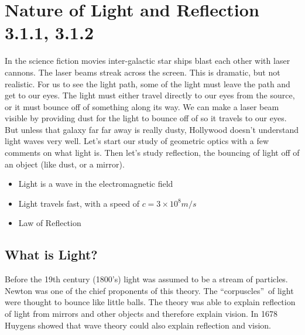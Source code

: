 \documentclass{article}
\begin{document}
\section{Nature of Light and Reflection 3.1.1, 3.1.2}

In the science fiction movies inter-galactic star ships blast each other
with laser cannons. The laser beams streak across the screen. This is
dramatic, but not realistic. For us to see the light path, some of the light
must leave the path and get to our eyes. The light must either travel
directly to our eyes from the source, or it must bounce off of something
along its way. We can make a laser beam visible by providing dust for the
light to bounce off of so it travels to our eyes. But unless that galaxy far
far away is really dusty, Hollywood doesn't understand light waves very
well. Let's start our study of geometric optics with a few comments on what
light is. Then let's study reflection, the bouncing of light off of an
object (like dust, or a mirror).

\vspace{0.10in}%

\begin{itemize}
\item Light is a wave in the electromagnetic field

\item Light travels fast, with a speed of $c=3\times 10^{8}\unit{m}/\unit{s}$

\item Law of Reflection
\end{itemize}

\subsection{What is Light?}

Before the 19th century (1800's) light was assumed to be a stream of
particles. Newton was one of the chief proponents of this theory. The
\textquotedblleft corpuscles\textquotedblright\ of light were thought to
bounce like little balls. The theory was able to explain reflection of light
from mirrors and other objects and therefore explain vision. In 1678 Huygens
showed that wave theory could also explain reflection and vision.
\end{document}
